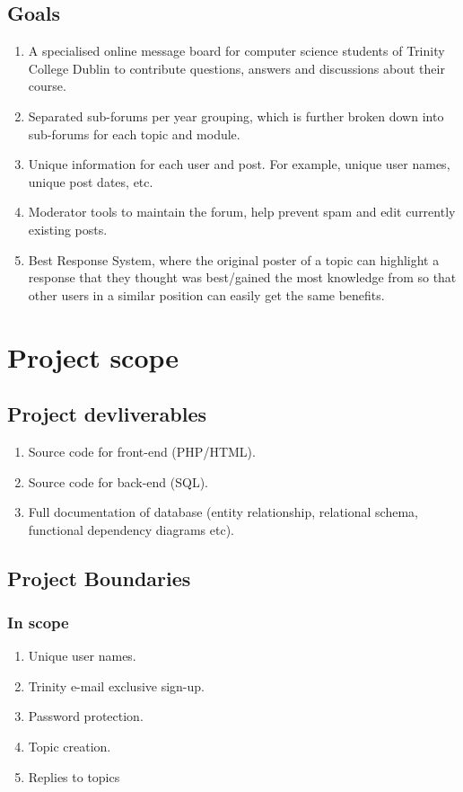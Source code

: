 \documentclass[a4paper, 12pt]{article}
\begin{document}
		\subsection{Goals}
			\begin{enumerate}[label*=\arabic*.]
				\item A specialised online message board for computer science students of Trinity College Dublin to contribute questions, answers and discussions about their course.
				\item Separated sub-forums per year grouping, which is further broken down into sub-forums for each topic and module.
				\item Unique information for each user and post. For example, unique user names, unique post dates, etc.
				\item Moderator tools to maintain the forum, help prevent spam and edit currently existing posts.
				\item Best Response System, where the original poster of a topic can highlight a response that they thought 
				was best/gained the most knowledge from so that other users in a similar position can easily get the same benefits.
			\end{enumerate}
	\newpage		
	\section{Project scope}
		\subsection{Project devliverables}
			\begin{enumerate}[label*=\arabic*.]
				\item Source code for front-end (PHP/HTML).
				\item Source code for back-end (SQL).
				\item Full documentation of database (entity relationship, relational schema, functional dependency diagrams etc).
			\end{enumerate}
		\subsection{Project Boundaries}
			\subsubsection{In scope}
				\begin{enumerate}[label*=\arabic*.]
					\item Unique user names.
					\item Trinity e-mail exclusive sign-up.
					\item Password protection.
					\item Topic creation.
					\item Replies to topics	
				\end{enumerate}
\end{document}
